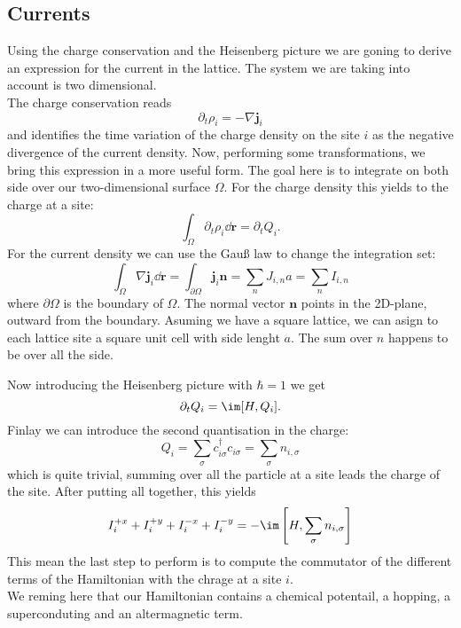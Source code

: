 \documentclass[../main.tex]{subfile}
\begin{document}
\subsection{Currents}
Using the charge conservation and the Heisenberg picture we are goning to derive an expression
for the current in the lattice. The system we are taking into account is two dimensional.\\

The charge conservation reads
\[
    \partial_t \rho_i = - \nabla \bm{j}_i
\]
and identifies the time variation of the charge density on the site $i$ as the negative divergence of the current density.
Now, performing some transformations, we bring this expression in a more useful form. The goal here is to integrate on both 
side over our two-dimensional surface $\Omega$. For the charge density this yields to the charge at a site:
\[
    \int_{\Omega} \partial_t \rho_i \dd \bm{r} = \partial_t Q_i .
\]
For the current density we can use the Gauß law to change the integration set:
\[
    \int_{\Omega} \nabla \bm{j}_i \dd \bm{r} = \int_{\partial \Omega} \bm{j}_i \bm{n} = \sum_{n} J_{i,n} a = \sum_{n} I_{i,n}
\]
where $\partial \Omega$ is the boundary of $\Omega$. The normal vector $\bm{n}$ points in the 2D-plane, outward from the boundary.
Asuming we have a square lattice, we can asign to each lattice site a square
unit cell with side lenght $a$. The sum over $n$ happens to be over all the side.

Now introducing the Heisenberg picture with $\hbar = 1$ we get
\[
    \partial_t Q_i = \im [H, Q_i].
\]
Finlay we can introduce the second quantisation in the charge:
\[
    Q_i = \sum_{\sigma} c_{i\sigma}^{\dagger}  c_{i\sigma} = \sum_{\sigma} n_{i,\sigma}
\]
which is quite trivial, summing over all the particle at a site leads the charge of the site. After putting all together, this yields
\begin{equation}
 I_{i}^{+x} +  I_{i}^{+y} +  I_{i}^{-x} +  I_{i}^{-y} = -\im \left[H, \sum_{\sigma} n_{i,\sigma}\right]
\end{equation}
This mean the last step to perform is to compute the commutator of the different terms of the Hamiltonian with the chrage at a site $i$.\\
We reming here that our Hamiltonian contains a chemical potentail, a hopping, a superconduting and an altermagnetic term.
\end{document}
